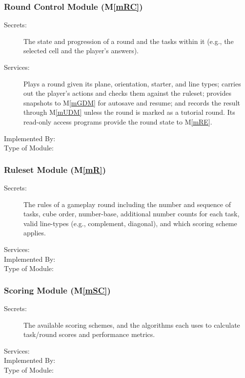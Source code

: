 \documentclass[12pt, titlepage]{article}
\newcommand{\mref}[1]{M\ref{#1}}
\begin{document}
\subsubsection{Round Control Module (\mref{mRC})}

\begin{description}
\item[Secrets:] The state and progression of a round and the tasks within it (e.g., the selected cell and the player's answers).
\item[Services:] Plays a round given its plane, orientation, starter, and line types; carries out the player's actions and checks them against the ruleset; provides snapshots to \mref{mGDM} for autosave and resume; and records the result through \mref{mUDM} unless the round is marked as a tutorial round. Its read-only access programs provide the round state to \mref{mRE}.
\item[Implemented By:]
\item[Type of Module:]
\end{description}

\subsubsection{Ruleset Module (\mref{mR})}

\begin{description}
\item[Secrets:] The rules of a gameplay round including the number and sequence of tasks, cube order, number-base, additional number counts for each task, valid line-types (e.g., complement, diagonal), and which scoring scheme applies.
\item[Services:]
\item[Implemented By:]
\item[Type of Module:]
\end{description}

\subsubsection{Scoring Module (\mref{mSC})}

\begin{description}
\item[Secrets:] The available scoring schemes, and the algorithms each uses to calculate task/round scores and performance metrics.
\item[Services:]
\item[Implemented By:]
\item[Type of Module:]
\end{description}
\end{document}
